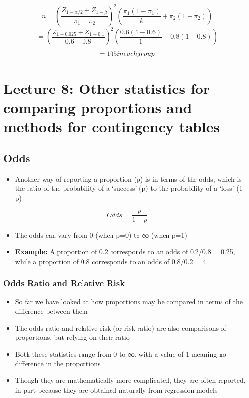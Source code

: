 \documentclass[
]{book}
\providecommand{\tightlist}{%
  \setlength{\itemsep}{0pt}\setlength{\parskip}{0pt}}
\begin{document}
\[n=\left(\frac{Z_{1-\alpha/2}+Z_{1-\beta}}{\pi_1-\pi_2}\right)^2\left(\frac{\pi_1(1-\pi_1)}{k}+\pi_2(1-\pi_2)\right)\]
\[=\left(\frac{Z_{1-0.025}+Z_{1-0.1}}{0.6-0.8}\right)^2\left(\frac{0.6(1-0.6)}{1}+0.8(1-0.8)\right)\]
\[=105\space in\space each\space group\]

\hypertarget{lecture-8-other-statistics-for-comparing-proportions-and-methods-for-contingency-tables}{%
\chapter{Lecture 8: Other statistics for comparing proportions and methods for contingency tables}\label{lecture-8-other-statistics-for-comparing-proportions-and-methods-for-contingency-tables}}

\hypertarget{odds}{%
\section{Odds}\label{odds}}

\begin{itemize}
\tightlist
\item
  Another way of reporting a proportion (p) is in terms of the odds, which is the ratio of the probability of a `success' (p) to the probability of a `loss' (1-p)
\end{itemize}

\[Odds=\frac{p}{1-p}\]

\begin{itemize}
\tightlist
\item
  The odds can vary from 0 (when p=0) to ∞ (when p=1)
\item
  \textbf{Example:} A proportion of 0.2 corresponds to an odds of 0.2/0.8 = 0.25, while a proportion of 0.8 corresponds to an odds of 0.8/0.2 = 4
\end{itemize}

\hypertarget{odds-ratio-and-relative-risk}{%
\subsection{Odds Ratio and Relative Risk}\label{odds-ratio-and-relative-risk}}

\begin{itemize}
\tightlist
\item
  So far we have looked at how proportions may be compared in terms of the difference between them
\item
  The odds ratio and relative risk (or risk ratio) are also comparisons of proportions, but relying on their ratio
\item
  Both these statistics range from 0 to ∞, with a value of 1 meaning no difference in the proportions
\item
  Though they are mathematically more complicated, they are often reported, in part because they are obtained naturally from regression models
\end{itemize}
\end{document}

